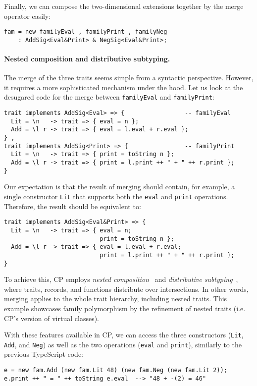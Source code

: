Finally, we can compose the two-dimensional extensions together by the merge
operator easily:
\begin{lstlisting}
fam = new familyEval , familyPrint , familyNeg
    : AddSig<Eval&Print> & NegSig<Eval&Print>;
\end{lstlisting}

\paragraph{Nested composition and distributive subtyping.}
The merge of the three traits seems simple from a syntactic perspective.
However, it requires a more sophisticated mechanism under the hood. Let us look
at the desugared code for the merge between \lstinline{familyEval} and
\lstinline{familyPrint}:
\begin{lstlisting}
trait implements AddSig<Eval> => {                 -- familyEval
  Lit = \n   -> trait => { eval = n };
  Add = \l r -> trait => { eval = l.eval + r.eval };
} ,
trait implements AddSig<Print> => {                -- familyPrint
  Lit = \n   -> trait => { print = toString n };
  Add = \l r -> trait => { print = l.print ++ " + " ++ r.print };
}
\end{lstlisting}
Our expectation is that the result of merging should contain, for example, a
single constructor \lstinline{Lit} that supports both the \lstinline{eval} and
\lstinline{print} operations. Therefore, the result should be equivalent to:
\begin{lstlisting}
trait implements AddSig<Eval&Print> => {
  Lit = \n   -> trait => { eval = n;
                           print = toString n };
  Add = \l r -> trait => { eval = l.eval + r.eval;
                           print = l.print ++ " + " ++ r.print };
}
\end{lstlisting}
To achieve this, CP employs \emph{nested composition}~\citep{bi2018essence} and
\emph{distributive subtyping}~\citep{barendregt1983filter}, where traits,
records, and functions distribute over intersections. In other words, merging
applies to the whole trait hierarchy, including nested traits. This example
showcases family polymorphism by the refinement of nested traits (i.e. CP's
version of virtual classes).

With these features available in CP, we can access the three constructors
(\lstinline{Lit}, \lstinline{Add}, and \lstinline{Neg}) as well as the two
operations (\lstinline{eval} and \lstinline{print}), similarly to the previous
TypeScript code:
\begin{lstlisting}
e = new fam.Add (new fam.Lit 48) (new fam.Neg (new fam.Lit 2));
e.print ++ " = " ++ toString e.eval  --> "48 + -(2) = 46"
\end{lstlisting}


